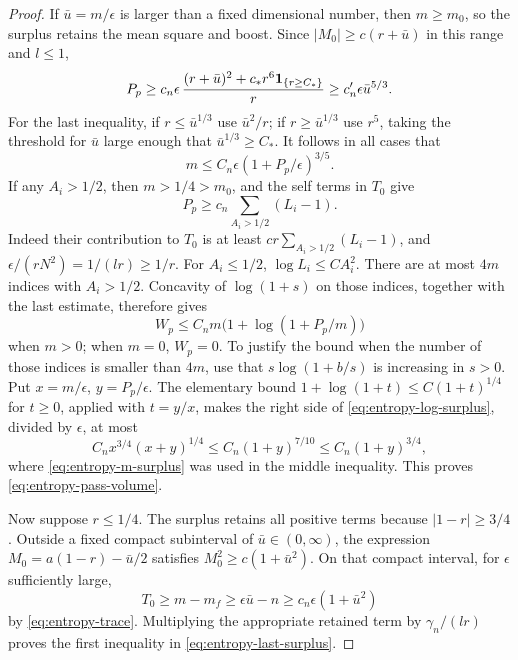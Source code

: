 \begin{proof}
If \(\bar u=m/\epsilon\) is larger than a fixed dimensional number, then
\(m\geq m_0\), so the surplus retains the mean square and boost.
Since \(|M_0|\geq c(r+\bar u)\) in this range and \(l\leq1\),
\[
 P_p\geq c_n\epsilon\,
 \frac{(r+\bar u)^2+c_*r^6\mathbf 1_{\{r\geq C_*\}}}{r}
       \geq c'_n\epsilon \bar u^{5/3}.
\]
For the last inequality, if \(r\leq \bar u^{1/3}\) use \(\bar u^2/r\);
if \(r\geq \bar u^{1/3}\) use \(r^5\), taking the threshold for \(\bar u\)
large enough that \(\bar u^{1/3}\geq C_*\).  It follows in all cases that
\begin{equation}\label{eq:entropy-m-surplus}
 m\leq C_n\epsilon(1+P_p/\epsilon)^{3/5}.
\end{equation}
If any \(A_i>1/2\), then \(m>1/4>m_0\), and the self terms in \(T_0\)
give
\[
 P_p\geq c_n\sum_{A_i>1/2}(L_i-1).
\]
Indeed their contribution to \(T_0\) is at least
\(c r\sum_{A_i>1/2}(L_i-1)\), and
\(\epsilon/(rN^2)=1/(lr)\geq1/r\).
For \(A_i\leq1/2\), \(\log L_i\leq C A_i^2\).
There are at most \(4m\) indices with \(A_i>1/2\).  Concavity of
\(\log(1+s)\) on those indices, together with the last estimate,
therefore gives
\begin{equation}\label{eq:entropy-log-surplus}
 W_p\leq C_n m\bigl(1+\log(1+P_p/m)\bigr)
\end{equation}
when \(m>0\); when \(m=0\), \(W_p=0\).
To justify the bound when the number of those indices is smaller
than \(4m\), use that \(s\log(1+b/s)\) is increasing in \(s>0\).
Put \(x=m/\epsilon\), \(y=P_p/\epsilon\).  The elementary bound
\(1+\log(1+t)\leq C(1+t)^{1/4}\) for \(t\geq0\), applied with
\(t=y/x\), makes the right side of
\eqref{eq:entropy-log-surplus}, divided by \(\epsilon\), at most
\[
 C_n x^{3/4}(x+y)^{1/4}
 \leq C_n(1+y)^{7/10}
 \leq C_n(1+y)^{3/4},
\]
where \eqref{eq:entropy-m-surplus} was used in the middle inequality.
This proves \eqref{eq:entropy-pass-volume}.

Now suppose \(r\leq1/4\).  The surplus retains all positive terms
because \(|1-r|\geq3/4\).  Outside a fixed compact subinterval of
\(\bar u\in(0,\infty)\), the expression \(M_0=a(1-r)-\bar u/2\) satisfies
\(M_0^2\geq c(1+\bar u^2)\).  On that compact interval, for \(\epsilon\)
sufficiently large,
\[
 T_0\geq m-m_f\geq\epsilon \bar u-n
       \geq c_n\epsilon(1+\bar u^2)
\]
by \eqref{eq:entropy-trace}.  Multiplying the appropriate retained
term by \(\gamma_n/(lr)\) proves the first inequality in
\eqref{eq:entropy-last-surplus}.


\end{proof}
